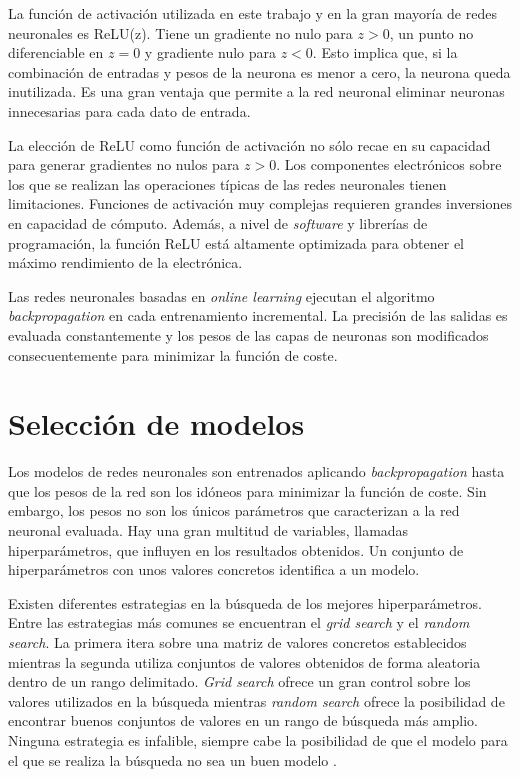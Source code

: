 La función de activación utilizada en este trabajo y en la gran mayoría de redes neuronales es ReLU(z). Tiene un gradiente no nulo para $z>0$, un punto no diferenciable en $z=0$ y gradiente nulo para $z<0$. Esto implica que, si la combinación de entradas y pesos de la neurona es menor a cero, la neurona queda inutilizada. Es una gran ventaja que permite a la red neuronal eliminar neuronas innecesarias para cada dato de entrada.

La elección de ReLU como función de activación no sólo recae en su capacidad para generar gradientes no nulos para $z>0$. Los componentes electrónicos sobre los que se realizan las operaciones típicas de las redes neuronales tienen limitaciones. Funciones de activación muy complejas requieren grandes inversiones en capacidad de cómputo. Además, a nivel de \textit{software} y librerías de programación, la función ReLU está altamente optimizada para obtener el máximo rendimiento de la electrónica.

Las redes neuronales basadas en \textit{online learning} ejecutan el algoritmo \textit{backpropagation} en cada entrenamiento incremental. La precisión de las salidas es evaluada constantemente y los pesos de las capas de neuronas son modificados consecuentemente para minimizar la función de coste.





\section{Selección de modelos} %
Los modelos de redes neuronales son entrenados aplicando \textit{backpropagation} hasta que los pesos de la red son los idóneos para minimizar la función de coste. Sin embargo, los pesos no son los únicos parámetros que caracterizan a la red neuronal evaluada. Hay una gran multitud de variables, llamadas hiperparámetros, que influyen en los resultados obtenidos. Un conjunto de hiperparámetros con unos valores concretos identifica a un modelo.

Existen diferentes estrategias en la búsqueda de los mejores hiperparámetros. Entre las estrategias más comunes se encuentran el \textit{grid search} y el \textit{random search}. La primera itera sobre una matriz de valores concretos establecidos mientras la segunda utiliza conjuntos de valores obtenidos de forma aleatoria dentro de un rango delimitado. \textit{Grid search} ofrece un gran control sobre los valores utilizados en la búsqueda mientras \textit{random search} ofrece la posibilidad de encontrar buenos conjuntos de valores en un rango de búsqueda más amplio. Ninguna estrategia es infalible, siempre cabe la posibilidad de que el modelo para el que se realiza la búsqueda no sea un buen modelo \cite{randomsearch}.

